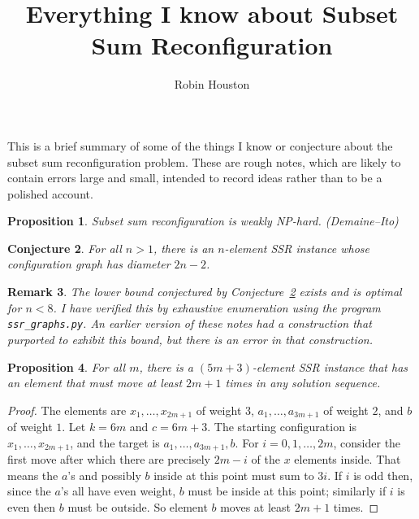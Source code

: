 \documentclass{robinminion}
\author{Robin Houston}
\title{Everything I know about Subset Sum Reconfiguration}
\newtheorem{prop}{Proposition}
\newtheorem{conjecture}[prop]{Conjecture}
\newtheorem{rem}[prop]{Remark}
\begin{document}
\maketitle
\linespread{1.1}\selectfont

\noindent This is a brief summary of some of the things I know or conjecture about the subset sum reconfiguration problem. These are rough notes, which are likely to contain errors large and small, intended to record ideas rather than to be a polished account.

\begin{prop}
    Subset sum reconfiguration is weakly NP-hard. \textup(Demaine--Ito\textup)
\end{prop}

\begin{conjecture}\label{conjecture:diameter}
    For all $n>1$, there is an $n$-element SSR instance whose configuration graph has diameter $2n-2$.
\end{conjecture}

\begin{rem}
    The lower bound conjectured by Conjecture~\ref{conjecture:diameter} exists and is optimal for $n<8$. I have verified this by exhaustive enumeration using the program \texttt{ssr\_graphs.py}. An earlier version of these notes had a construction that purported to exhibit this bound, but there is an error in that construction.
\end{rem}

\begin{prop}\label{prop:element-moves-a-lot}
    For all $m$, there is a $(5m+3)$-element SSR instance that has an element that must move at least $2m+1$ times in any solution sequence.
\end{prop}
\begin{proof}
    The elements are $x_1, \dots, x_{2m+1}$ of weight $3$, $a_1, \dots, a_{3m+1}$ of weight $2$, and $b$ of weight $1$.
    Let $k=6m$ and $c=6m+3$. The starting configuration is $x_1, \dots, x_{2m+1}$, and the target is $a_1, \dots, a_{3m+1}, b$. For $i=0, 1, \dots, 2m$, consider the first move after which there are precisely $2m-i$ of the $x$ elements inside. That means the $a$'s and possibly $b$ inside at this point must sum to $3i$. If $i$ is odd then, since the $a$'s all have even weight, $b$ must be inside at this point; similarly if $i$ is even then $b$ must be outside. So element $b$ moves at least $2m+1$ times.
\end{proof}
\end{document}
